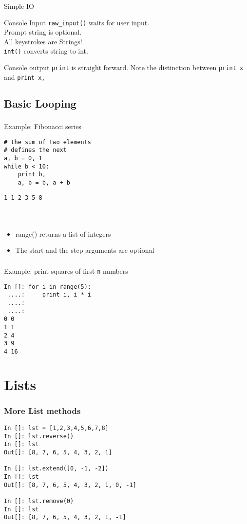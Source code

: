 \documentclass[14pt,compress]{beamer}
\newcounter{time}
\newcommand{\inctime}[1]{\addtocounter{time}{#1}{\tiny \thetime\ m}}
\newcommand{\typ}[1]{\texttt{#1}}
\newcommand{\kwrd}[1]{ \texttt{\textbf{\color{blue}{#1}}}  }
\begin{document}
\begin{frame}{Simple IO}
  \begin{block}
    {Console Input}
    \texttt{raw\_input()} waits for user input.\\Prompt string is optional.\\
    All keystrokes are Strings!\\\texttt{int()} converts string to int.
  \end{block}
  \begin{block}
    {Console output}
    \texttt{print} is straight forward. Note the distinction between \texttt{print x} and \texttt{print x,}
  \end{block}
\end{frame}

\subsection{Basic Looping}
\begin{frame}[fragile]
  \frametitle{\kwrd{while}}
Example: Fibonacci series
  \begin{lstlisting}
# the sum of two elements
# defines the next
a, b = 0, 1
while b < 10:
    print b,
    a, b = b, a + b 
\end{lstlisting}
\typ{1 1 2 3 5 8}\\  
\end{frame}

\begin{frame}[fragile]
\frametitle{\kwrd{range()}}
\kwrd{range([start,] stop[, step])}\\
\begin{itemize}
  \item \alert {range() returns a list of integers}
  \item \alert {The start and the step arguments are optional}  
\end{itemize}
\end{frame}

\begin{frame}[fragile]
  \frametitle{\kwrd{for}}
Example: print squares of first \typ{n} numbers
  \begin{lstlisting}
In []: for i in range(5):
 ....:     print i, i * i
 ....:     
 ....:     
0 0
1 1
2 4
3 9
4 16
\end{lstlisting}
\inctime{15}
\end{frame}

\section{Lists}
\begin{frame}[fragile]
\frametitle{More List methods}
\begin{lstlisting}
In []: lst = [1,2,3,4,5,6,7,8]
In []: lst.reverse()
In []: lst
Out[]: [8, 7, 6, 5, 4, 3, 2, 1]

In []: lst.extend([0, -1, -2])
In []: lst
Out[]: [8, 7, 6, 5, 4, 3, 2, 1, 0, -1]

In []: lst.remove(0)
In []: lst
Out[]: [8, 7, 6, 5, 4, 3, 2, 1, -1]
\end{lstlisting}
\end{frame}
\end{document}
